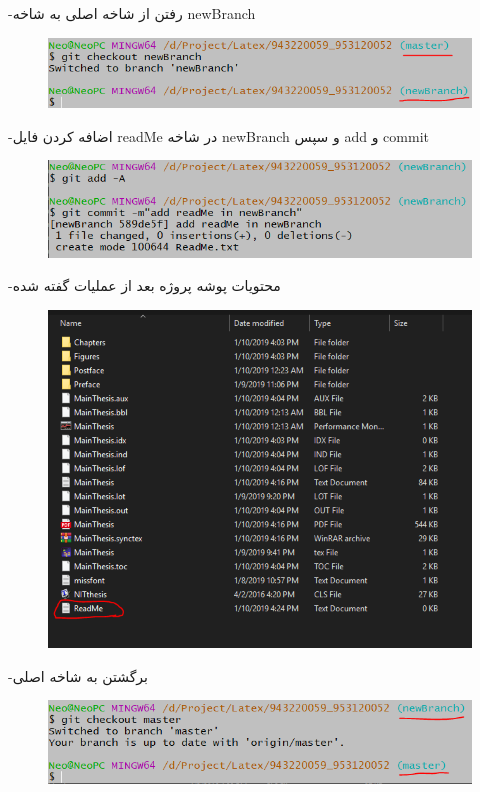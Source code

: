 -رفتن از شاخه اصلی به شاخه newBranch
\begin{figure}[tbh]
	\centering
	\includegraphics[width=1\textwidth]{./Figures/n2}
	\caption{  }
	\label{n2}
\end{figure}
\newpage

-اضافه کردن فایل readMe در شاخه newBranch و سپس add و commit
\begin{figure}[tbh]
	\centering
	\includegraphics[width=1\textwidth]{./Figures/n3}
	\caption{  }
	\label{n3}
\end{figure}


-محتویات پوشه پروژه بعد از عملیات گفته شده
\begin{figure}[tbh]
	\centering
	\includegraphics[width=1\textwidth]{./Figures/n4}
	\caption{  }
	\label{n4}
\end{figure}
\newpage
-برگشتن به شاخه اصلی


\begin{figure}[tbh]
	\centering
	\includegraphics[width=1\textwidth]{./Figures/n6}
	\caption{  }
	\label{n6}
\end{figure}

